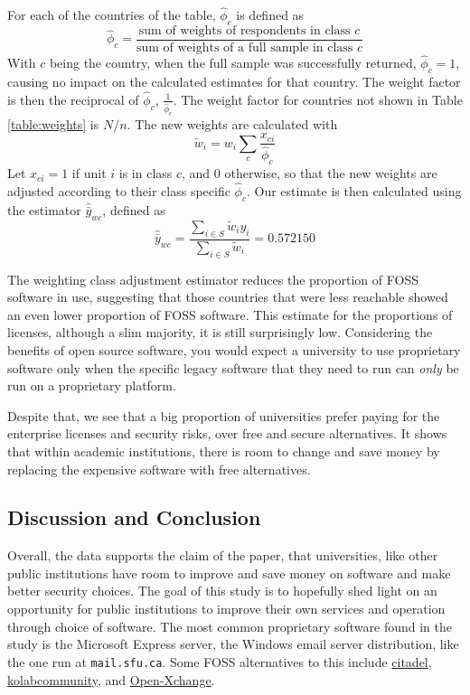 \documentclass{article}
\theoremstyle{definition}
\begin{document}
\begin{flushleft}
\begin{multicols}{2}
For each of the countries of the table, $\hat{\phi}_c$ is defined as
$$
\hat{\phi}_c
=
\frac{
\textrm{sum of weights of respondents in class $c$}
}{
\textrm{sum of weights of a full sample in class $c$}
}
$$
With $c$ being the country, when the full sample was successfully returned,
$\hat{\phi}_c=1$, causing no impact on the calculated estimates for that country.
The weight factor is then the reciprocal of $\hat{\phi}_c$, $\frac{1}{\hat{\phi}_c}$.
The weight factor for countries not shown in Table \ref{table:weights} is $N/n$.
The new weights are calculated with
$$
\tilde{w}_i
=
w_i
\sum_{c}
\frac{x_{ci}}{\hat{\phi}_c}
$$
Let $x_{ci}=1$ if unit $i$ is in class $c$, and $0$ otherwise, so that
the new weights are adjusted according to their class specific $\hat{\phi}_c$.
Our estimate is then calculated using the estimator $\hat{\bar{y}}_{wc}$,
defined as
$$
\hat{\bar{y}}_{wc}
=
\frac{
	\sum_{i \in S} \tilde{w}_iy_i
}{
	\sum_{i \in S} \tilde{w}_i
}
=
0.572150
$$

The weighting class adjustment estimator reduces the proportion of FOSS software
in use, suggesting that those countries that were less reachable showed an even
lower proportion of FOSS software.
This estimate for the proportions of licenses, although a slim majority, it is still
surprisingly
low. Considering the benefits of open source software, you would expect a
university to use proprietary software only when the specific legacy software
that they need to run can \textit{only} be run on a proprietary platform.

Despite that, we see that a big proportion of universities prefer paying for the
enterprise licenses and security risks, over free and secure alternatives. It shows
that within academic institutions, there is room to change and save money by
replacing the expensive software with free alternatives.

\subsection{Discussion and Conclusion}
Overall, the data supports the claim of the paper, that universities,
like other public institutions have room to improve and save money on
software and make better security choices.
The goal of this study is to hopefully shed
light on an opportunity for public institutions to improve their own
services and operation through choice of software. The most common
proprietary software found in the study is the Microsoft Express
server, the Windows email server distribution, like the one run at
\texttt{mail.sfu.ca}. Some FOSS alternatives to this include
\href{https://www.citadel.org/}{citadel},
\href{https://kolab.org/}{kolabcommunity}, and
\href{https://www.open-xchange.com/}{Open-Xchange}.


\end{multicols}
\end{flushleft}
\end{document}
